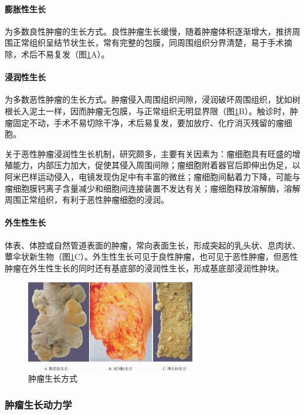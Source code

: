 \paragraph{膨胀性生长}
为多数良性肿瘤的生长方式。良性肿瘤生长缓慢，随着肿瘤体积逐渐增大，推挤周围正常组织呈结节状生长，常有完整的包膜，同周围组织分界清楚，易于手术摘除，术后不易复发（图\ref{fig5-5}A）。

\paragraph{浸润性生长}
为多数恶性肿瘤的生长方式。肿瘤侵入周围组织间隙，浸润破坏周围组织，犹如树根长入泥土一样，因而肿瘤无包膜，与正常组织无明显界限（图\ref{fig5-5}B）。触诊时，肿瘤固定不动，手术不易切除干净，术后易复发，要加放疗、化疗消灭残留的瘤细胞。

关于恶性肿瘤浸润性生长机制，研究颇多，主要有关因素为：瘤细胞具有旺盛的增殖能力，内部压力加大，促使其侵入周围间隙；瘤细胞附着器官后即伸出伪足，以阿米巴样运动侵入，电镜发现伪足中有丰富的微丝；瘤细胞间黏着力下降，可能与瘤细胞膜钙离子含量减少和细胞间连接装置不发达有关；瘤细胞释放溶解酶，溶解周围正常组织，有利于恶性肿瘤细胞的浸润。

\paragraph{外生性生长}
体表、体腔或自然管道表面的肿瘤，常向表面生长，形成突起的乳头状、息肉状、蕈伞状新生物（图\ref{fig5-5}C）。外生性生长可见于良性肿瘤，也可见于恶性肿瘤，但恶性肿瘤在外生性生长的同时还有基底部的浸润性生长，形成基底部浸润性肿块。

\begin{figure}[!htbp]
  \centering
  \includegraphics[width=0.66\textwidth]{./images/Image00072.jpg}
  \caption{肿瘤生长方式}
  \label{fig5-5}
\end{figure}

\subsubsection{肿瘤生长动力学}

